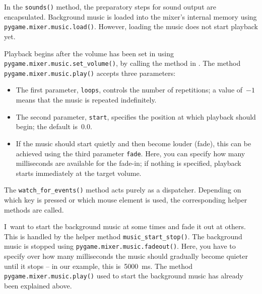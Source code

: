 In the \texttt{sounds()} method, the preparatory steps for sound output are encapsulated. Background music is loaded into the mixer's internal memory using \texttt{pygame\-.mixer\-.music\-.load()}. However, loading the music does not start playback yet.  

Playback begins after the volume has been set in  using \texttt{pygame\-.mixer\-.music\-.set\-\_volume()}, by calling the method in . The method \texttt{pygame\-.mixer\-.music\-.play()} accepts three parameters: 
\begin{itemize}
	\item The first parameter, \texttt{loops}, controls the number of repetitions; a value of~$-1$ means that the music is repeated indefinitely. 
	\item The second parameter, \texttt{start}, specifies the position at which playback should begin; the default is~$0.0$. 
	\item If the music should start quietly and then become louder (\gls{fade}), this can be achieved using the third parameter \texttt{fade}. Here, you can specify how many milliseconds are available for the fade-in; if nothing is specified, playback starts immediately at the target volume.
\end{itemize}


 The \texttt{watch\_for\_events()} method acts purely as a dispatcher. Depending on which key is pressed or which mouse element is used, the corresponding helper methods are called.


I~want to start the background music at some times and fade it out at others. This is handled by the helper method \texttt{music\_start\_stop()}. The background music is stopped using \texttt{pygame.mixer.music.fadeout()}. Here, you have to specify over how many milliseconds the music should gradually become quieter until it stops -- in our example, this is~\SI{5000}{ms}. The method \texttt{pygame.mixer.music.play()} used to start the background music has already been explained above.

